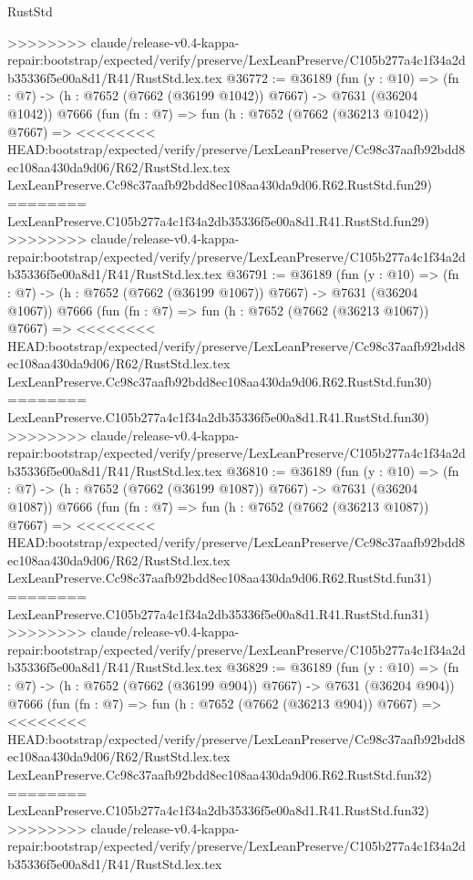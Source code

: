 \begin{lexlean}{RustStd}
\begin{coremodule}
{\begin{coremodule}
{{{{{{{{{{{{{{{{{{{{{{{{{{{{{{{{{{{{{{{{{{{{{{{{{{{{{>>>>>>>> claude/release-v0.4-kappa-repair:bootstrap/expected/verify/preserve/LexLeanPreserve/C105b277a4c1f34a2db35336f5e00a8d1/R41/RustStd.lex.tex
@36772 := @36189
    (fun (y : @10) => (fn : @7) -> (h : @7652 (@7662 (@36199 @1042)) @7667) -> @7631 (@36204 @1042))
    @7666
    (fun (fn : @7) =>
    fun (h : @7652 (@7662 (@36213 @1042)) @7667) =>
<<<<<<<< HEAD:bootstrap/expected/verify/preserve/LexLeanPreserve/Cc98c37aafb92bdd8ec108aa430da9d06/R62/RustStd.lex.tex
    LexLeanPreserve.Cc98c37aafb92bdd8ec108aa430da9d06.R62.RustStd.fun29)
========
    LexLeanPreserve.C105b277a4c1f34a2db35336f5e00a8d1.R41.RustStd.fun29)
>>>>>>>> claude/release-v0.4-kappa-repair:bootstrap/expected/verify/preserve/LexLeanPreserve/C105b277a4c1f34a2db35336f5e00a8d1/R41/RustStd.lex.tex
@36791 := @36189
    (fun (y : @10) => (fn : @7) -> (h : @7652 (@7662 (@36199 @1067)) @7667) -> @7631 (@36204 @1067))
    @7666
    (fun (fn : @7) =>
    fun (h : @7652 (@7662 (@36213 @1067)) @7667) =>
<<<<<<<< HEAD:bootstrap/expected/verify/preserve/LexLeanPreserve/Cc98c37aafb92bdd8ec108aa430da9d06/R62/RustStd.lex.tex
    LexLeanPreserve.Cc98c37aafb92bdd8ec108aa430da9d06.R62.RustStd.fun30)
========
    LexLeanPreserve.C105b277a4c1f34a2db35336f5e00a8d1.R41.RustStd.fun30)
>>>>>>>> claude/release-v0.4-kappa-repair:bootstrap/expected/verify/preserve/LexLeanPreserve/C105b277a4c1f34a2db35336f5e00a8d1/R41/RustStd.lex.tex
@36810 := @36189
    (fun (y : @10) => (fn : @7) -> (h : @7652 (@7662 (@36199 @1087)) @7667) -> @7631 (@36204 @1087))
    @7666
    (fun (fn : @7) =>
    fun (h : @7652 (@7662 (@36213 @1087)) @7667) =>
<<<<<<<< HEAD:bootstrap/expected/verify/preserve/LexLeanPreserve/Cc98c37aafb92bdd8ec108aa430da9d06/R62/RustStd.lex.tex
    LexLeanPreserve.Cc98c37aafb92bdd8ec108aa430da9d06.R62.RustStd.fun31)
========
    LexLeanPreserve.C105b277a4c1f34a2db35336f5e00a8d1.R41.RustStd.fun31)
>>>>>>>> claude/release-v0.4-kappa-repair:bootstrap/expected/verify/preserve/LexLeanPreserve/C105b277a4c1f34a2db35336f5e00a8d1/R41/RustStd.lex.tex
@36829 := @36189
    (fun (y : @10) => (fn : @7) -> (h : @7652 (@7662 (@36199 @904)) @7667) -> @7631 (@36204 @904))
    @7666
    (fun (fn : @7) =>
    fun (h : @7652 (@7662 (@36213 @904)) @7667) =>
<<<<<<<< HEAD:bootstrap/expected/verify/preserve/LexLeanPreserve/Cc98c37aafb92bdd8ec108aa430da9d06/R62/RustStd.lex.tex
    LexLeanPreserve.Cc98c37aafb92bdd8ec108aa430da9d06.R62.RustStd.fun32)
========
    LexLeanPreserve.C105b277a4c1f34a2db35336f5e00a8d1.R41.RustStd.fun32)
>>>>>>>> claude/release-v0.4-kappa-repair:bootstrap/expected/verify/preserve/LexLeanPreserve/C105b277a4c1f34a2db35336f5e00a8d1/R41/RustStd.lex.tex
}}}}}}}}}}}}}}}}}}}}}}}}}}}}}}}}}}}}}}}}}}}}}}}}}}}}}
\end{coremodule}}
\end{coremodule}
\end{lexlean}
